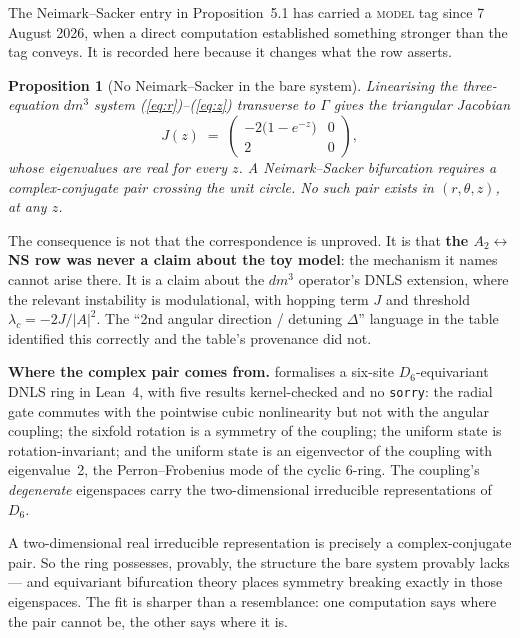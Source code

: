 \documentclass[11pt]{article}
\theoremstyle{boxed}
\newtheorem{proposition}[theorem]{Proposition}
\begin{document}
The Neimark--Sacker entry in Proposition~5.1 has carried a \textsc{model} tag since 7 August 2026,
when a direct computation established something stronger than the tag conveys. It is recorded here
because it changes what the row asserts.

\begin{proposition}[No Neimark--Sacker in the bare system]
Linearising the three-equation $dm^3$ system (\ref{eq:r})--(\ref{eq:z}) transverse to $\Gamma$ gives the
triangular Jacobian
\[
J(z) \;=\;
\begin{pmatrix} -2\bigl(1 - e^{-z}\bigr) & 0 \\[2pt] 2 & 0 \end{pmatrix},
\]
whose eigenvalues are real for every $z$. A Neimark--Sacker bifurcation requires a
complex-conjugate pair crossing the unit circle. No such pair exists in $(r,\theta,z)$, at any $z$.
\end{proposition}

\noindent The consequence is not that the correspondence is unproved. It is that
\textbf{the $A_2 \leftrightarrow$ NS row was never a claim about the toy model}: the mechanism it
names cannot arise there. It is a claim about the $dm^3$ operator's DNLS extension, where the
relevant instability is modulational, with hopping term $J$ and threshold
$\lambda_c = -2J/|A|^2$. The ``2nd angular direction / detuning $\Delta$'' language in the table
identified this correctly and the table's provenance did not.

\smallskip
\noindent\textbf{Where the complex pair comes from.} \cite{wp77} formalises a six-site
$D_6$-equivariant DNLS ring in Lean~4, with five results kernel-checked and no \texttt{sorry}: the
radial gate commutes with the pointwise cubic nonlinearity but not with the angular coupling; the
sixfold rotation is a symmetry of the coupling; the uniform state is rotation-invariant; and the
uniform state is an eigenvector of the coupling with eigenvalue~2, the Perron--Frobenius mode of the
cyclic $6$-ring. The coupling's \emph{degenerate} eigenspaces carry the two-dimensional irreducible
representations of $D_6$.

A two-dimensional real irreducible representation is precisely a complex-conjugate pair. So the ring
possesses, provably, the structure the bare system provably lacks --- and equivariant bifurcation
theory places symmetry breaking exactly in those eigenspaces. The fit is sharper than a resemblance:
one computation says where the pair cannot be, the other says where it is.
\end{document}
